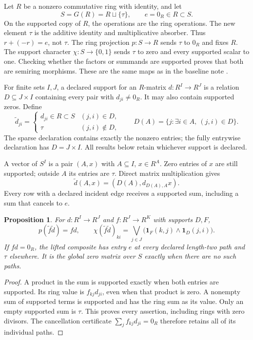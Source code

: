 \documentclass[11pt,a4paper]{article}
\newtheorem{proposition}[theorem]{Proposition}
\theoremstyle{definition}\newtheorem{definition}[theorem]{Definition}
\begin{document}
Let \(R\) be a nonzero commutative ring with identity, and let
\[
 S=G(R)=R\sqcup\{\tau\},\qquad e=0_R\in R\subset S.
 \tag{SCD1}
\]
On the supported copy of \(R\), the operations are the ring operations.
The new element \(\tau\) is the additive identity and multiplicative
absorber. Thus \(r+(-r)=e\), not \(\tau\).
The ring projection \(p:S\to R\) sends \(\tau\) to \(0_R\) and fixes
\(R\). The support character \(\chi:S\to\{0,1\}\) sends \(\tau\) to zero
and every supported scalar to one. Checking whether the factors or
summands are supported proves that both are semiring morphisms.
These are the same maps as in the baseline note \cite{globalization}.

For finite sets \(I,J\), a declared support for an \(R\)-matrix
\(d:R^I\to R^J\) is a relation \(D\subseteq J\times I\) containing
every pair with \(d_{ji}\ne0_R\). It may also contain supported zeros.
Define
\[
 \widetilde d_{ji}=
 \begin{cases}d_{ji}\in R\subset S &(j,i)\in D,\\
 \tau &(j,i)\notin D,
 \end{cases}
 \qquad
 D(A)=\{j:\exists i\in A,\ (j,i)\in D\}.
 \tag{SCD2}
\]
The sparse declaration contains exactly the nonzero entries;
the fully entrywise declaration has \(D=J\times I\).
All results below retain whichever support is declared.

A vector of \(S^I\) is a pair \((A,x)\) with \(A\subseteq I\),
\(x\in R^A\). Zero entries of \(x\) are still supported; outside
\(A\) its entries are \(\tau\). Direct matrix multiplication gives
\[
 \widetilde d(A,x)=(D(A),d_{D(A),A}x).
 \tag{SCD3}
\]
Every row with a declared incident edge receives a supported sum,
including a sum that cancels to \(e\).

\begin{proposition}
For \(d:R^I\to R^J\) and \(f:R^J\to R^K\) with supports \(D,F\),
\[
 p(\widetilde f\widetilde d)=fd,\qquad
 \chi(\widetilde f\widetilde d)_{ki}
 =\bigvee_{j\in J}\bigl(\mathbf1_F(k,j)\wedge\mathbf1_D(j,i)\bigr).
 \tag{SCD4}
\]
If \(fd=0_R\), the lifted composite has entry \(e\) at every
declared length-two path and \(\tau\) elsewhere. It is the global
zero matrix over \(S\) exactly when there are no such paths.
\end{proposition}
\begin{proof}
A product in the sum is supported exactly when both entries are
supported. Its ring value is \(f_{kj}d_{ji}\), even when that product
is zero. A nonempty sum of supported terms is supported and has the
ring sum as its value. Only an empty supported sum is \(\tau\).
This proves every assertion, including rings with zero divisors.
The cancellation certificate \(\sum_j f_{kj}d_{ji}=0_R\) therefore
retains all of its individual paths.
\end{proof}
\end{document}
